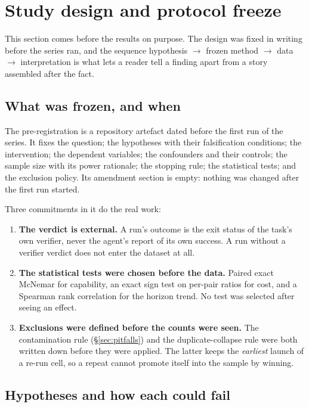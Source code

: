 \section{Study design and protocol freeze}
\label{sec:design}

This section comes before the results on purpose. The design was fixed in
writing before the series ran, and the sequence hypothesis $\rightarrow$
frozen method $\rightarrow$ data $\rightarrow$ interpretation is what lets a
reader tell a finding apart from a story assembled after the fact.

\subsection{What was frozen, and when}

The pre-registration is a repository artefact dated before the first run of
the series\code. It fixes the question; the hypotheses with their
falsification conditions; the intervention; the dependent variables; the
confounders and their controls; the sample size with its power rationale;
the stopping rule; the statistical tests; and the exclusion policy. Its
amendment section is empty: nothing was changed after the first run started.

Three commitments in it do the real work:

\begin{enumerate}
\item \textbf{The verdict is external.} A run's outcome is the exit status
      of the task's own verifier, never the agent's report of its own
      success. A run without a verifier verdict does not enter the dataset
      at all.
\item \textbf{The statistical tests were chosen before the data.} Paired
      exact McNemar for capability, an exact sign test on per-pair ratios
      for cost, and a Spearman rank correlation for the horizon trend. No
      test was selected after seeing an effect.
\item \textbf{Exclusions were defined before the counts were seen.} The
      contamination rule (\S\ref{sec:pitfalls}) and the duplicate-collapse
      rule were both written down before they were applied. The latter
      keeps the \emph{earliest} launch of a re-run cell, so a repeat cannot
      promote itself into the sample by winning.
\end{enumerate}

\subsection{Hypotheses and how each could fail}

